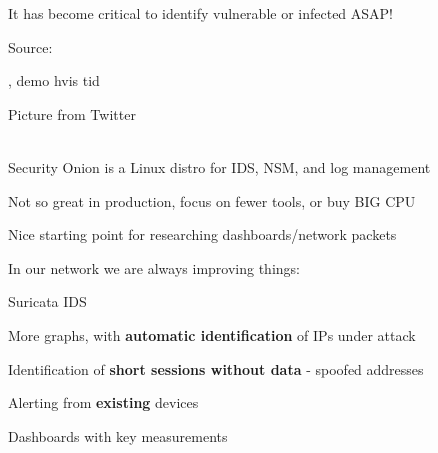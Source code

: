 \documentclass[20pt,landscape,a4paper,footrule]{foils}
\begin{document}
\vskip 1cm

\centerline{It has become critical to identify vulnerable or infected ASAP!}

Source:
{\tiny{}}



, demo hvis tid





Picture from Twitter\\
\\




\begin{list2}
\item Security Onion is a Linux distro for IDS, NSM, and log management
\item {}
\item {}
\item Not so great in production, focus on fewer tools, or buy BIG CPU \smiley
\end{list2}

\centerline{Nice starting point for researching dashboards/network packets}



In our network we are always improving things:
\begin{list1}
\item Suricata IDS 
\item More graphs, with {\bf automatic identification} of IPs under attack
\item Identification of {\bf short sessions without data} - spoofed addresses
\item Alerting from {\bf existing} devices
\item Dashboards with key measurements
\end{list1}
\end{document}
